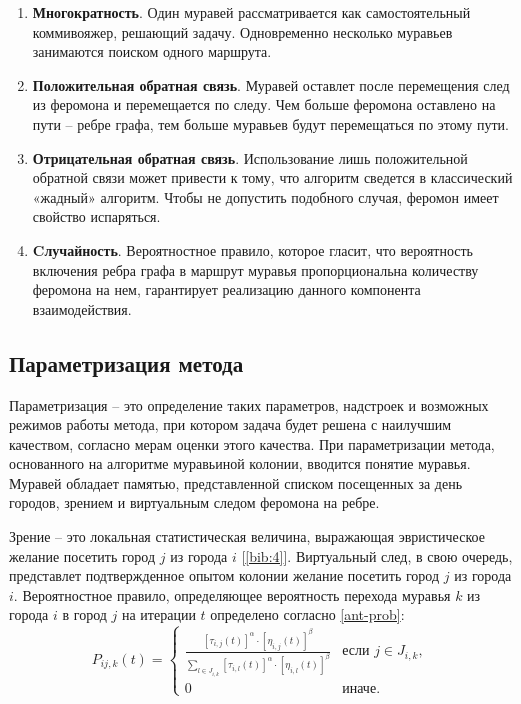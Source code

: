     \begin{enumerate}
    	\item \textbf{Многократность}. Один муравей рассматривается как самостоятельный коммивояжер, решающий задачу. Одновременно несколько муравьев занимаются поиском одного маршрута.
    	\item \textbf{Положительная обратная связь}. Муравей оставлет после перемещения след из феромона и перемещается по следу. Чем больше феромона оставлено на пути -- ребре графа, тем больше муравьев будут перемещаться по этому пути.
    	\item \textbf{Отрицательная обратная связь}. Использование лишь положительной обратной связи может привести к тому, что алгоритм сведется в классический «жадный» алгоритм. Чтобы не допустить подобного случая, феромон имеет свойство испаряться.
    	\item \textbf{Cлучайность}. Вероятностное правило, которое гласит, что вероятность включения ребра графа в маршрут муравья пропорциональна количеству феромона на нем, гарантирует реализацию данного компонента взаимодействия.
    \end{enumerate}

    \subsection*{Параметризация метода}

    \par Параметризация -- это определение таких параметров, надстроек и возможных режимов работы метода, при котором задача будет решена с наилучшим качеством, согласно мерам оценки этого качества. При параметризации метода, основанного на алгоритме муравьиной колонии, вводится понятие муравья. Муравей обладает памятью, представленной списком посещенных за день городов, зрением и виртуальным следом феромона на ребре.

    \par Зрение -- это локальная статистическая величина, выражающая эвристическое желание посетить город $𝑗$ из города $𝑖$ [\ref{bib:4}]. Виртуальный след, в свою очередь, представлет подтвержденное опытом колонии желание посетить город $𝑗$ из города $𝑖$. Вероятностное правило, определяющее вероятность перехода муравья $𝑘$ из города $𝑖$ в город $𝑗$ на итерации $𝑡$ определено согласно \ref{ant-prob}:
	\begin{equation}\label{ant-prob}
		P_{ij, k}\left(t\right) = 
		\begin{cases}
		\frac{
			\displaystyle \left[\tau_{i,j}\left(t\right)\right]^{\alpha} \cdot \left[\eta_{i,j}\left(t\right)\right]^{\beta} 	
		}{
			\displaystyle \sum_{l \in J_{i, k}} \left[\tau_{i,l}\left(t\right)\right]^{\alpha} \cdot \left[\eta_{i,l}\left(t\right)\right]^{\beta} 	
		} & \text{если }j \in J_{i,k}, \\
		
		0 & \text{иначе.}
		
		\end{cases}
	\end{equation}

